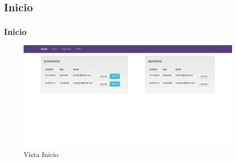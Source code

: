 \subsection{Inicio}
\frame
{
  \frametitle{Inicio}
  
	\begin{figure}[h]
	\begin{center}
	 	\includegraphics[scale=0.20]{./resources/vistas/inicio.png} 
		\caption{Vista Inicio}
	\end{center}
	\end{figure}
}
